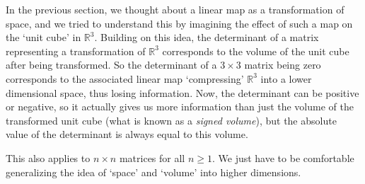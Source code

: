 \documentclass{article}
\theoremstyle{plain}
\newcommand{\bR}{\mathbb{R}}
\begin{document}
In the previous section, we thought about a linear map as a transformation of space, and we tried to understand this by imagining the effect of such a map on the `unit cube' in $\bR^3$. Building on this idea, the determinant of a matrix representing a transformation of $\bR^3$ corresponds to the volume of the unit cube after being transformed. So the determinant of a $3\times 3$ matrix being zero corresponds to the associated linear map `compressing' $\bR^3$ into a lower dimensional space, thus losing information. Now, the determinant can be positive or negative, so it actually gives us more information than just the volume of the transformed unit cube (what is known as a \emph{signed volume}), but the absolute value of the determinant is always equal to this volume. 

This also applies to $n\times n$ matrices for all $n\geq 1$. We just have to be comfortable generalizing the idea of `space' and `volume' into higher dimensions.   
\end{document}
